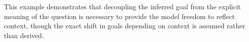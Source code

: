 \documentclass[11pt, floatsintext]{apa6}
\begin{document}
This example demonstrates that decoupling the inferred goal from the explicit meaning of the question is necessary to provide the model freedom to reflect context, though the exact shift in goals depending on context is assumed rather than derived. 




\end{document}

